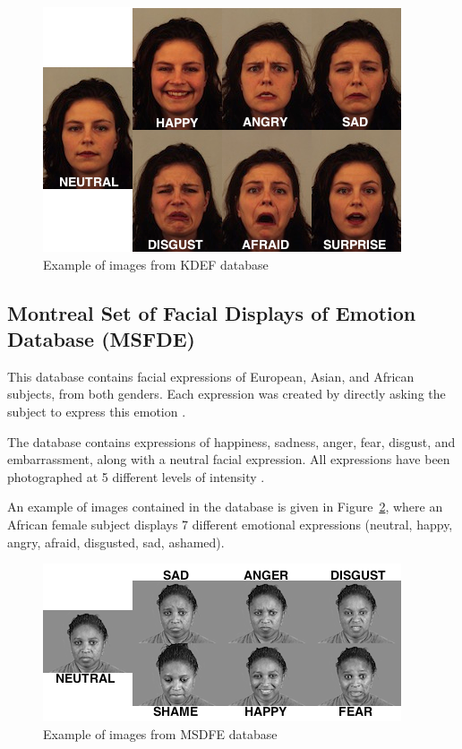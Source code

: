 \begin{figure}[!h]
\begin{center}
\noindent \includegraphics[scale=0.65]{figures/kdef_7facialexpressions} 
\newline
\caption{Example of images from KDEF database}
\label{kdef_7facialexpressions}
\end{center} 
\end{figure}

\subsection{Montreal Set of Facial Displays of Emotion Database (MSFDE)}

\vspace{\baselineskip}
\noindent This database contains facial expressions of European, Asian, and African subjects, from both genders. Each expression was created by directly asking the subject to express this emotion \cite{MSFDE}.
\newline

\noindent The database contains expressions of happiness, sadness, anger, fear, disgust, and embarrassment, along with a neutral facial expression. All expressions have been photographed at 5 different levels of intensity \cite{MSFDE}.
\newline

\noindent An example of images contained in the database is given in Figure~\ref{msfde_7facialexpressions}, where an African female subject displays 7 different emotional expressions (neutral, happy, angry, afraid, disgusted, sad, ashamed).
\newline

\begin{figure}[!h]
\begin{center}
\noindent \includegraphics[scale=0.8]{figures/msfde_7facialexpressions} 
\newline
\caption{Example of images from MSDFE database}
\label{msfde_7facialexpressions}
\end{center} 
\end{figure}

